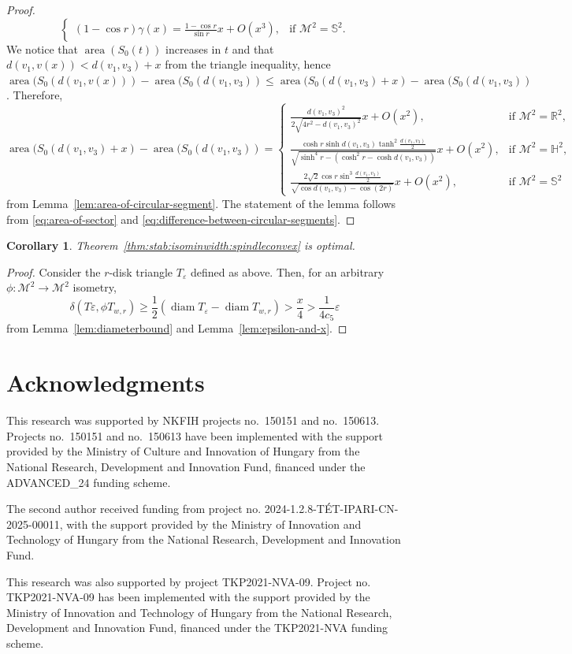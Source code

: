 \documentclass[12pt,reqno]{amsart}
\newtheorem{corollary}[theorem]{Corollary}
\theoremstyle{remark}
\newcommand{\R}{{\mathbb R}}
\newcommand{\hyp}{{\mathbb H}}
\newcommand{\sph}{{\mathbb S}}
\newcommand{\M}{\mathcal{M}}
\DeclareMathOperator{\diam}{\mathrm{diam}}
\DeclareMathOperator{\area}{\mathrm{area}}
\begin{document}
\begin{proof}
\begin{equation}
\begin{cases}
    (1-\cos r)\gamma(x)=\frac{1-\cos r}{\sin r}x+O(x^3),&\text{if }\M^2=\sph^2.
\end{cases}
\end{equation}
We notice that $\area(S_0(t))$ increases in $t$ and that $d(v_1,v(x))<d(v_1,v_3)+x$ from the triangle inequality, hence $\area(S_0(d(v_1,v(x)))-\area(S_0(d(v_1,v_3))\leq\area(S_0(d(v_1,v_3)+x)-\area(S_0(d(v_1,v_3))$. 
Therefore,
\begin{equation}\label{eq:difference-between-circular-segments}
\area(S_0(d(v_1,v_3)+x)-\area(S_0(d(v_1,v_3))=\begin{cases}
    \frac{d(v_1,v_3)^2}{2\sqrt{4r^2-d(v_1,v_3)^2}}x+O(x^2),&\text{if }\M^2=\R^2,\\
    \frac{\cosh r\sinh d(v_1,v_3)\tanh^2\frac{d(v_1,v_3)}{2}}{\sqrt{\sinh^4 r-(\cosh^2 r-\cosh d(v_1,v_3))}}x+O(x^2),&\text{if }\M^2=\hyp^2,\\
    \frac{2\sqrt{2}\cos r\sin^3\frac{d(v_1,v_3)}{2}}{\sqrt{\cos d(v_1,v_3)-\cos(2r)}}x+O(x^2),&\text{if }\M^2=\sph^2
\end{cases}
\end{equation}
from Lemma~\ref{lem:area-of-circular-segment}. The statement of the lemma follows from \eqref{eq:area-of-sector} and \eqref{eq:difference-between-circular-segments}.
\end{proof}

\begin{corollary}
Theorem~\ref{thm:stab:isominwidth:spindleconvex} is optimal.
\end{corollary}
\begin{proof}
Consider the $r$-disk triangle $T_\varepsilon$ defined as above. Then, for an arbitrary $\phi\colon\M^2\to\M^2$ isometry,
\[
\delta(T\varepsilon,\phi T_{w,r})\geq\frac{1}{2}(\diam T_\varepsilon-\diam T_{w,r})>\frac{x}{4}>\frac{1}{4c_5}\varepsilon
\]
from Lemma~\ref{lem:diameterbound} and Lemma~\ref{lem:epsilon-and-x}.
\end{proof}

\section*{Acknowledgments}
This research was supported by NKFIH projects no.~150151 and no.~150613. Projects no.~150151 and no.~150613 have been implemented with the support provided by the Ministry of Culture and Innovation of Hungary from the National Research, Development and Innovation Fund, financed under the ADVANCED\_24 funding scheme.

The second author received funding from project no. 2024-1.2.8-T\'ET-IPARI-CN-2025-00011,
with the support provided by the Ministry of Innovation and Technology
of Hungary from the National Research, Development and Innovation Fund.

This research was also supported by project TKP2021-NVA-09. Project no. TKP2021-NVA-09 has been implemented with the support provided by the Ministry of Innovation and Technology of Hungary from the National Research, Development and Innovation Fund, financed under the TKP2021-NVA funding scheme.





\end{document}
